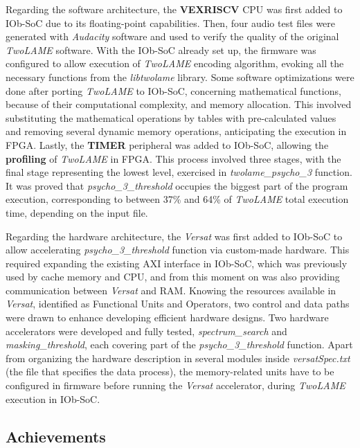 Regarding the software architecture, the \textbf{VEXRISCV} CPU was first added to IOb-SoC due to its floating-point capabilities. Then, four audio test files were generated with \textit{Audacity} software and used to verify the quality of the original \textit{TwoLAME} software. 
With the IOb-SoC already set up, the firmware was configured to allow execution of \textit{TwoLAME} encoding algorithm, evoking all the necessary functions from the \textit{libtwolame} library. 
Some software optimizations were done after porting \textit{TwoLAME} to IOb-SoC, concerning mathematical functions, because of their computational complexity, and memory allocation. This involved substituting the mathematical operations by tables with pre-calculated values and removing several dynamic memory operations, anticipating the execution in FPGA. 
Lastly, the \textbf{TIMER} peripheral was added to IOb-SoC, allowing the \textbf{profiling} of \textit{TwoLAME} in FPGA. This process involved three stages, with the final stage representing the lowest level, exercised in \textit{twolame\_psycho\_3} function.
It was proved that \textit{psycho\_3\_threshold} occupies the biggest part of the program execution, corresponding to between 37\% and 64\% of \textit{TwoLAME} total execution time, depending on the input file.

Regarding the hardware architecture, the \textit{Versat} was first added to IOb-SoC to allow accelerating \textit{psycho\_3\_threshold} function via custom-made hardware. This required expanding the existing AXI interface in IOb-SoC, which was previously used by cache memory and CPU, and from this moment on was also providing communication between \textit{Versat} and RAM.
Knowing the resources available in \textit{Versat}, identified as Functional Units and Operators, two control and data paths were drawn to enhance developing efficient hardware designs.
Two hardware accelerators were developed and fully tested, \textit{spectrum\_search} and \textit{masking\_threshold}, each covering part of the \textit{psycho\_3\_threshold} function. Apart from organizing the hardware description in several modules inside \textit{versatSpec.txt} (the file that specifies the data process), the memory-related units have to be configured in firmware before running the \textit{Versat} accelerator, during \textit{TwoLAME} execution in IOb-SoC. 

\subsection{Achievements}

